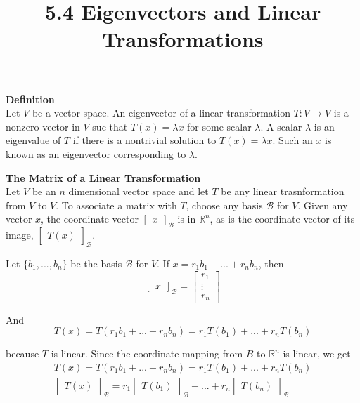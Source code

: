 \documentclass{article}
\title{5.4 Eigenvectors and Linear Transformations}
\begin{document}
  \maketitle
  \textbf{Definition}\\
  Let $ V $ be a vector space. An eigenvector of a linear transformation $ T:V\to V $ is a nonzero vector in $ V $ suc that $ T(x)=\lambda x $ for some scalar $ \lambda $. A scalar $ \lambda $ is an eigenvalue of $ T $ if there is a nontrivial solution to $ T(x)=\lambda x $. Such an $ x $ is known as an eigenvector corresponding to $ \lambda $.

  \textbf{The Matrix of a Linear Transformation}\\
  Let $ V $ be an $ n $ dimensional vector space and let $ T $ be any linear trasnformation from $ V $ to $ V $. To associate a matrix with $ T $, choose any basis $ \mathcal{B} $ for $ V $. Given any vector $ x $, the coordinate vector $ \begin{bmatrix}
    x
  \end{bmatrix}_\mathcal{B} $ is in $ \mathbb{R}^{n} $, as is the coordinate vector of its image, $ \begin{bmatrix}
    T(x)
  \end{bmatrix}_\mathcal{B} $.

  Let $ \{ b_1,...,b_n \} $ be the basis $ \mathcal{B} $ for $ V $. If $ x=r_1b_1+...+r_nb_n $, then
  \[
    \begin{bmatrix}
    x
  \end{bmatrix}_\mathcal{B} =
  \begin{bmatrix}
    r_1\\
    \vdots\\
    r_n
  \end{bmatrix}
  \]
  
  And
  \[
    T(x)=T(r_1b_1+...+r_nb_n)=r_1T(b_1)+...+r_nT(b_n)
  \]

  because $ T $ is linear. Since the coordinate mapping from $ B $ to $ \mathbb{R}^{n} $ is linear, we get
  \[
    \begin{gathered}
     T(x)=T(r_1b_1+...+r_nb_n)=r_1T(b_1)+...+r_nT(b_n)\\
     \begin{bmatrix}
       T(x)
     \end{bmatrix}_\mathcal{B}=r_1
     \begin{bmatrix}
       T(b_1)
     \end{bmatrix}_\mathcal{B}+...+
     r_n\begin{bmatrix}
       T(b_n)
     \end{bmatrix}_\mathcal{B}
    \end{gathered}
  \]
  
\end{document}
